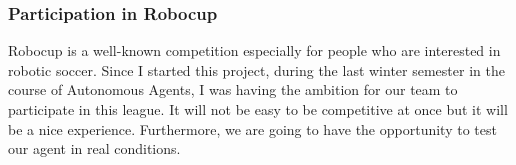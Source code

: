 \subsubsection*{Participation in Robocup}
Robocup is a well-known competition especially for people who are interested in robotic soccer. Since I started this project, during the last winter semester in the course of Autonomous Agents, I was having the ambition for our team to participate in this league. It will not be easy to be competitive at once but it will be a nice experience. Furthermore, we are going to have the opportunity to test our agent in real conditions.
 


